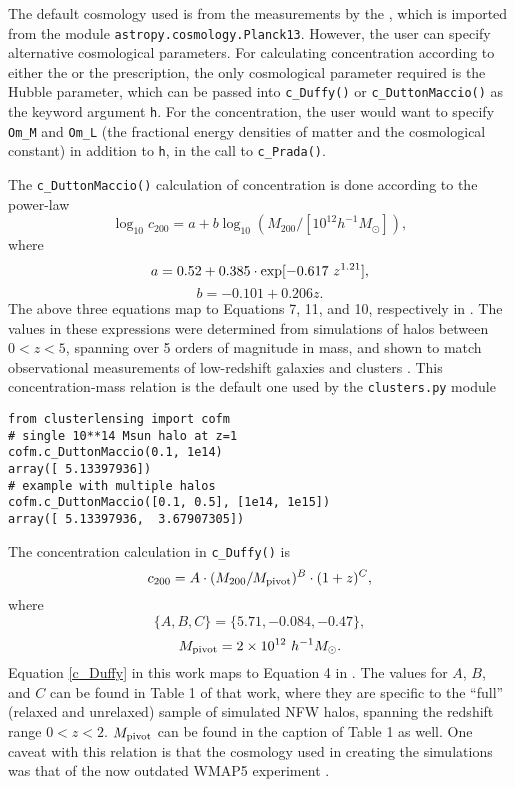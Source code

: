\documentclass{emulateapj}
\newcommand{\code}{\lstinline[style=codeintext]}
\begin{document}
The default cosmology used is from the measurements by the \citet{PlanckXVI}, which is imported from the module \code{astropy.cosmology.Planck13}. However, the user can specify alternative cosmological parameters. For calculating concentration according to either the \citet{Duffy08} or the \citet{Dutton14} prescription, the only cosmological parameter required is the Hubble parameter, which can be passed into \code{c_Duffy()} or \code{c_DuttonMaccio()} as the keyword argument \code{h}. For the \citet{Prada12} concentration, the user would want to specify \code{Om_M} and \code{Om_L} (the fractional energy densities of matter and the cosmological constant) in addition to \code{h}, in the call to \code{c_Prada()}.

The \code{c_DuttonMaccio()} calculation of concentration is done according to the power-law
\begin{equation}
\log_{10} c_{200} = a + b \log_{10}(M_{200} / [10^{12} h^{-1} M_{\odot}]), 
\end{equation}
where
\begin{equation}
a = 0.52 + 0.385 \cdot {\rm exp}[-0.617\ z^{1.21}],
\end{equation}
\begin{equation}
b = -0.101 + 0.206 z.
\end{equation}
The above three equations map to Equations 7, 11, and 10, respectively in \citet{Dutton14}. The values in these expressions were determined from simulations of halos between $0 < z < 5$, spanning over 5 orders of magnitude in mass, and shown to match observational measurements of low-redshift galaxies and clusters \citep{Dutton14}. This concentration-mass relation is the default one used by the \code{clusters.py} module

\begin{lstlisting}
from clusterlensing import cofm
# single 10**14 Msun halo at z=1
cofm.c_DuttonMaccio(0.1, 1e14)
array([ 5.13397936])
# example with multiple halos
cofm.c_DuttonMaccio([0.1, 0.5], [1e14, 1e15])
array([ 5.13397936,  3.67907305])
\end{lstlisting}

The concentration calculation in \code{c_Duffy()} is
\begin{equation}\label{c_Duffy}
c_{200} = A \cdot (M_{200} / M_{\rm pivot})^B \cdot (1 + z)^C,
\end{equation}
where
\begin{equation}
\{A, B, C\} = \{5.71, -0.084, -0.47\},
\end{equation}
\begin{equation}
M_{\rm pivot} = 2 \times 10^{12}\ h^{-1} M_{\odot}.
\end{equation}
Equation \ref{c_Duffy} in this work maps to Equation 4 in \citet{Duffy08}. The values for $A$, $B$, and $C$ can be found in Table 1 of that work, where they are specific to the ``full'' (relaxed and unrelaxed) sample of simulated NFW halos, spanning the redshift range $0 < z < 2$. $M_{\rm pivot}$ can be found in the caption of Table 1 as well. One caveat with this relation is that the cosmology used in creating the \citet{Duffy08} simulations was that of the now outdated WMAP5 experiment \citep{WMAP5}.
\end{document}
